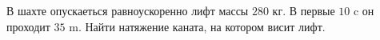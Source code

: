 В шахте опускаеться равноускоренно лифт массы $280$ кг. В первые $10$ c
он проходит $35$ m. Найти натяжение каната, на котором висит лифт.
